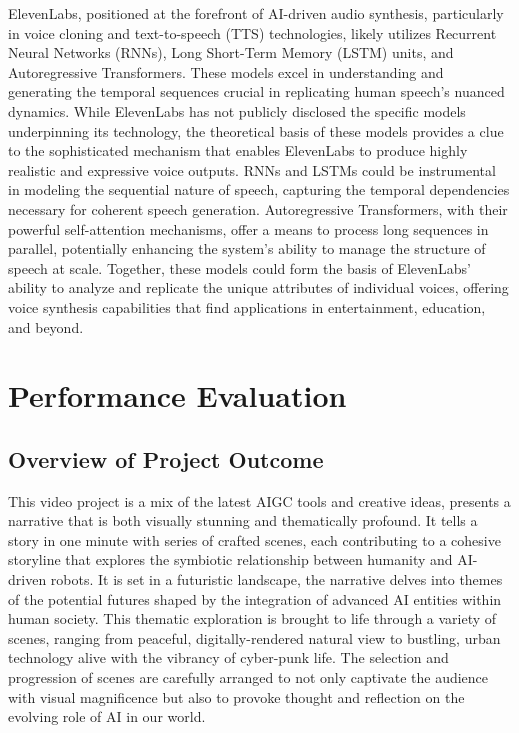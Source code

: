 \documentclass[11pt,a4paper,oneside]{report}
\begin{document}
ElevenLabs, positioned at the forefront of AI-driven audio synthesis, particularly in voice cloning and text-to-speech (TTS) technologies, likely utilizes Recurrent Neural Networks (RNNs), Long Short-Term Memory (LSTM) units, and Autoregressive Transformers. 
These models excel in understanding and generating the temporal sequences crucial in replicating human speech's nuanced dynamics. 
While ElevenLabs has not publicly disclosed the specific models underpinning its technology, the theoretical basis of these models provides a clue to the sophisticated mechanism that enables ElevenLabs to produce highly realistic and expressive voice outputs. 
RNNs and LSTMs could be instrumental in modeling the sequential nature of speech, capturing the temporal dependencies necessary for coherent speech generation. 
Autoregressive Transformers, with their powerful self-attention mechanisms, offer a means to process long sequences in parallel, potentially enhancing the system's ability to manage the structure of speech at scale. 
Together, these models could form the basis of ElevenLabs’ ability to analyze and replicate the unique attributes of individual voices, offering voice synthesis capabilities that find applications in entertainment, education, and beyond.


\chapter{Performance Evaluation}

\section{Overview of Project Outcome}

This video project is a mix of the latest AIGC tools and creative ideas, presents a narrative that is both visually stunning and thematically profound. 
It tells a story in one minute with series of crafted scenes, each contributing to a cohesive storyline that explores the symbiotic relationship between humanity and AI-driven robots.
It is set in a futuristic landscape, the narrative delves into themes of the potential futures shaped by the integration of advanced AI entities within human society. 
This thematic exploration is brought to life through a variety of scenes, ranging from peaceful, digitally-rendered natural view to bustling, urban technology alive with the vibrancy of cyber-punk life. 
The selection and progression of scenes are carefully arranged to not only captivate the audience with visual magnificence but also to provoke thought and reflection on the evolving role of AI in our world.
\end{document}
